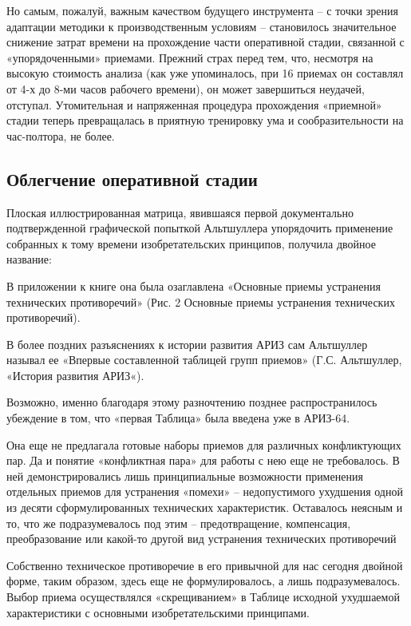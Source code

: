 \documentclass[11pt,a4paper]{article}
\begin{document}
Но самым, пожалуй, важным качеством будущего инструмента -- с точки зрения
адаптации методики к производственным условиям -- становилось значительное
снижение затрат времени на прохождение части оперативной стадии, связанной с
«упорядоченными» приемами. Прежний страх перед тем, что, несмотря на высокую
стоимость анализа (как уже упоминалось, при 16 приемах он составлял от 4-х до
8-ми часов рабочего времени), он может завершиться неудачей,
отступал. Утомительная и напряженная процедура прохождения «приемной» стадии
теперь превращалась в приятную тренировку ума и сообразительности на
час-полтора, не более.

\subsection*{Облегчение оперативной стадии}

Плоская иллюстрированная матрица, явившаяся первой документально
подтвержденной графической попыткой Альтшуллера упорядочить применение
собранных к тому времени изобретательских принципов, получила двойное
название:

В приложении к книге она была озаглавлена «Основные приемы устранения
технических противоречий» (Рис. 2 Основные приемы устранения технических
противоречий).

В более поздних разъяснениях к истории развития АРИЗ сам Альтшуллер называл ее
«Впервые составленной таблицей групп приемов» (Г.С. Альтшуллер, «История
развития АРИЗ«).

Возможно, именно благодаря этому разночтению позднее распространилось
убеждение в том, что «первая Таблица» была введена уже в АРИЗ-64.

Она еще не предлагала готовые наборы приемов для различных конфликтующих
пар. Да и понятие «конфликтная пара» для работы с нею еще не требовалось. В
ней демонстрировались лишь принципиальные возможности применения отдельных
приемов для устранения «помехи» -- недопустимого ухудшения одной из десяти
сформулированных технических характеристик. Оставалось неясным и то, что же
подразумевалось под этим -- предотвращение, компенсация, преобразование или
какой-то другой вид устранения технических противоречий

Собственно техническое противоречие в его привычной для нас сегодня двойной
форме, таким образом, здесь еще не формулировалось, а лишь
подразумевалось. Выбор приема осуществлялся «скрещиванием» в Таблице исходной
ухудшаемой характеристики с основными изобретательскими принципами.
\end{document}
